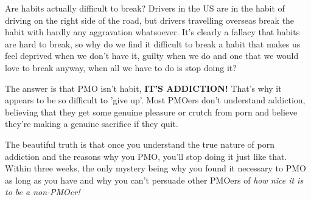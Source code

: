 \documentclass[easypeasy.tex]{subfiles}
\begin{document}
Are habits actually difficult to break? Drivers in the US are in the habit of driving on the right side of the road, but drivers travelling overseas break the habit with hardly any aggravation whatsoever. It's clearly a fallacy that habits are hard to break, so why do we find it difficult to break a habit that makes us feel deprived when we don't have it, guilty when we do and one that we would love to break anyway, when all we have to do is stop doing it?

The answer is that PMO isn't habit, \textbf{IT'S ADDICTION!} That's why it appears to be so difficult to 'give up'. Most PMOers don't understand addiction, believing that they get some genuine pleasure or crutch from porn and believe they're making a genuine sacrifice if they quit.

The beautiful truth is that once you understand the true nature of porn addiction and the reasons why you PMO, you'll stop doing it just like that. Within three weeks, the only mystery being why you found it necessary to PMO as long as you have and why you can't persuade other PMOers of \textit{how nice it is to be a non-PMOer!}
\end{document}
